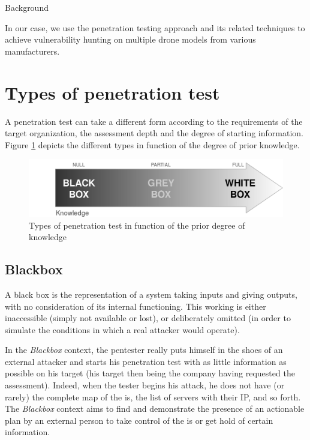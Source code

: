\begin{chaptercover}{Background}
\begin{tip} 
In our case, we use the penetration testing approach and its related techniques to achieve vulnerability hunting on multiple drone models from various manufacturers.
\end{tip}

\section{Types of penetration test}

A penetration test can take a different form according to the requirements of the target organization, the assessment depth and the degree of starting information. Figure \ref{fig:pentest-types} depicts the different types in function of the degree of prior knowledge.

\begin{figure}[H]
  \centering
  \includegraphics[width=.7\linewidth]{figures/pentest-types}
  \caption{Types of penetration test in function of the prior degree of knowledge}
  \label{fig:pentest-types}
\end{figure}

\subsection{Blackbox}

A black box is the representation of a system taking inputs and giving outputs, with no consideration of its internal functioning. This working is either inaccessible (simply not available or lost), or deliberately omitted (in order to simulate the conditions in which a real attacker would operate).

In the \textit{Blackbox} context, the pentester really puts himself in the shoes of an external attacker and starts his penetration test with as little information as possible on his target (his target then being the company having requested the assessment). Indeed, when the tester begins his attack, he does not have (or rarely) the complete map of the \acrshort{is}, the list of servers with their IP, and so forth. The \textit{Blackbox} context aims to find and demonstrate the presence of an actionable plan by an external person to take control of the \acrshort{is} or get hold of certain information.


\end{chaptercover}
